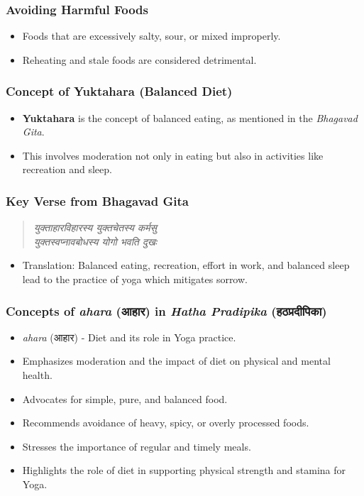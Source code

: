 \begin{frame}[fragile]\frametitle{Avoiding Harmful Foods}
    \begin{itemize}
        \item Foods that are excessively salty, sour, or mixed improperly.
        \item Reheating and stale foods are considered detrimental.
    \end{itemize}
\end{frame}


\begin{frame}[fragile]\frametitle{Concept of Yuktahara (Balanced Diet)}
    \begin{itemize}
        \item \textbf{Yuktahara} is the concept of balanced eating, as mentioned in the \textit{Bhagavad Gita}.
        \item This involves moderation not only in eating but also in activities like recreation and sleep.
    \end{itemize}
\end{frame}

\begin{frame}[fragile]\frametitle{Key Verse from Bhagavad Gita}
    \begin{quote}
        \textit{युक्ताहारविहारस्य युक्तचेतस्य कर्मसु \\
        युक्तस्वप्नावबोधस्य योगो भवति दुखः}
    \end{quote}
    \begin{itemize}
        \item Translation: Balanced eating, recreation, effort in work, and balanced sleep lead to the practice of yoga which mitigates sorrow.
    \end{itemize}
\end{frame}



\begin{frame}[fragile]\frametitle{Concepts of \textit{ahara} (आहार) in \textit{Hatha Pradipika} (हठप्रदीपिका)}

      \begin{itemize}
		\item \textit{ahara} (आहार) - Diet and its role in Yoga practice.
		\item Emphasizes moderation and the impact of diet on physical and mental health.
		\item Advocates for simple, pure, and balanced food.
		\item Recommends avoidance of heavy, spicy, or overly processed foods.
		\item Stresses the importance of regular and timely meals.
		\item Highlights the role of diet in supporting physical strength and stamina for Yoga.
	  \end{itemize}

\end{frame}

